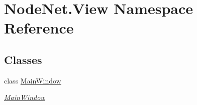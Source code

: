 \hypertarget{namespace_node_net_1_1_view}{}\section{Node\+Net.\+View Namespace Reference}
\label{namespace_node_net_1_1_view}
\subsection*{Classes}
\begin{DoxyCompactItemize}
\item 
class \hyperlink{class_node_net_1_1_view_1_1_main_window}{Main\+Window}
\begin{DoxyCompactList}\small\item\em \hyperlink{class_node_net_1_1_view_1_1_main_window}{Main\+Window} \end{DoxyCompactList}\end{DoxyCompactItemize}
